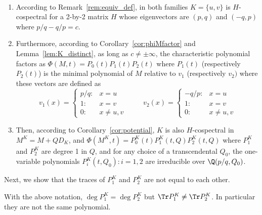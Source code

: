 \begin{coro}\label{cor:uv_example}~
\begin{enumerate}
\item According to Remark~\ref{rem:equiv_def}, in both families $K = \{u,v\}$ is $H$-cospectral for a 2-by-2 matrix $H$ whose eigenvectors are $(p,q)$ and $(-q,p)$ where $p/q - q/p = c$. 
\item Furthermore, according to Corollary~\ref{cor:phiMfactor} and Lemma~\ref{lem:K_distinct}, as long as $c \neq \pm \infty$, the characteristic polynomial factors as $\Phi(M,t) = P_0(t) P_1(t) P_2(t)$ where $P_1(t)$ (respectively $P_2(t)$) is the minimal polynomial of $M$ relative to $v_1$ (respectively $v_2)$  where these vectors are defined as 
\[ v_1(x) = \left \{ \begin{array}{cc} p/q :& x=u \\ 1 :& x=v \\ 0 :& x\neq u,v \end{array} \right.  \hspace{1cm} v_2(x) = \left \{ \begin{array}{cc} -q/p :& x=u \\ 1 :& x=v \\ 0 :& x\neq u,v \end{array} \right. \]
\item Then, according to Corollary~\ref{cor:potential}, $K$ is also $H$-cospectral in $M^K = M + Q D_K$, and $\Phi(M^K,t) = P^K_0(t) P^K_1(t,Q) P^K_2(t,Q)$ where $P^K_1$ and $P^K_2$ are degree 1 in $Q$, and for any choice of a transcendental $Q_0$, the one-variable polynomials $P^K_i(t,Q_0) : i = 1,2$ are irreducible over $\Q(p/q, Q_0)$.
\end{enumerate}
\end{coro}

Next, we show that the traces of $P^K_1$ and $P^K_2$ are not equal to each other.

\begin{lemma}\label{lem:STfamily_trace}
With the above notation, $\deg P^K_1 = \deg P^K_2$ but $\Tr P^K_1 \neq \Tr P^K_2$. In particular they are not the same polynomial.
\end{lemma}

